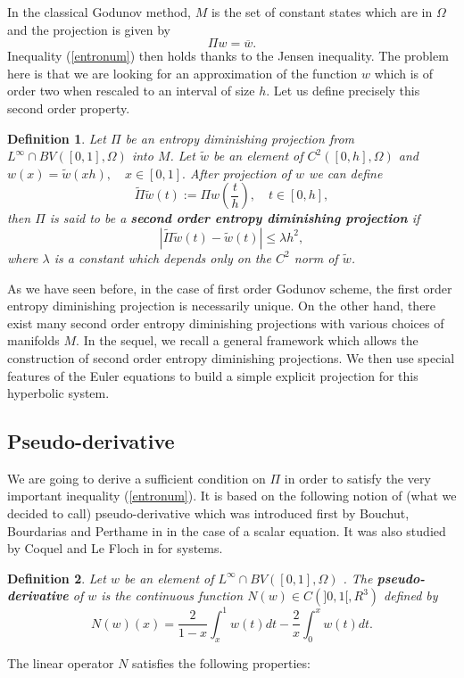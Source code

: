 \documentclass{fldauth}
\theoremstyle{plain}
\theoremstyle{plain}
\theoremstyle{plain}
\theoremstyle{plain}
\newtheorem{defn}{Definition}
\theoremstyle{plain}
\theoremstyle{plain}
\begin{document}
In the classical Godunov method, \( M \) is the set of constant states which
are in \( \Omega  \) and the projection is given by
\[
\Pi w=\overline{w}.\]
Inequality (\ref{entronum}) then holds thanks to the Jensen inequality. The
problem here is that we are looking for an approximation of the function \( w \)
which is of order two when rescaled to an interval of size \( h \). Let us
define precisely this second order property.

\begin{defn}
Let \( \Pi  \) be an entropy diminishing projection from \( L^{\infty }\cap BV([0,1],\Omega ) \)
into \( M \). Let \( \widetilde{w} \) be an element of \( C^{2}([0,h],\Omega ) \)
and \( w(x)=\widetilde{w}(xh),\quad x\in [0,1]. \) After projection of \( w \)
we can define
\[
\widetilde{\Pi }\widetilde{w}(t):=\Pi w(\frac{t}{h}),\quad t\in [0,h],\]
then \( \Pi  \) is said to be a \textbf{second order entropy diminishing projection}
if
\begin{equation}
\label{ordre2}
\left| \widetilde{\Pi }\widetilde{w}(t)-\widetilde{w}(t)\right| \leq \lambda h^{2},
\end{equation}
where \( \lambda  \) is a constant which depends only on the \( C^{2} \) norm
of \( \widetilde{w} \).
\end{defn}
As we have seen before, in the case of first order Godunov scheme, the first
order entropy diminishing projection is necessarily unique. On the other hand,
there exist many second order entropy diminishing projections with various choices
of manifolds \( M \). In the sequel, we recall a general framework which allows
the construction of second order entropy diminishing projections. We then use
special features of the Euler equations to build a simple explicit projection
for this hyperbolic system.


\subsection{Pseudo-derivative}

We are going to derive a sufficient condition on \( \Pi  \) in order to satisfy
the very important inequality (\ref{entronum}). It is based on the following
notion of (what we decided to call) pseudo-derivative which was introduced first
by Bouchut, Bourdarias and Perthame in \cite{bouchut_pertham93} in the case
of a scalar equation. It was also studied by Coquel and Le Floch in \cite{coquel_lefloch95}
for systems.

\begin{defn}\label{defN}
Let \( w \) be an element of \( L^{\infty }\cap BV([0,1],\Omega ) \) . The
\textbf{pseudo-derivative} of \( w \) is the continuous function \( N(w)\in C(]0,1[,R^{3}) \)
defined by
\[
N(w)(x)=\frac{2}{1-x}\int _{x}^{1}w(t)dt-\frac{2}{x}\int _{0}^{x}w(t)dt.\]

\end{defn}
The linear operator \( N \) satisfies the following properties:
\end{document}
